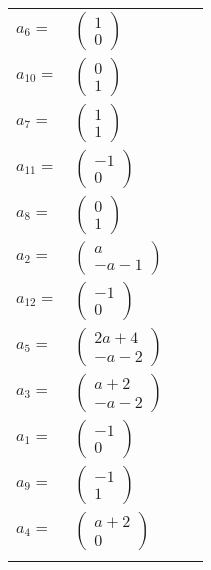 \documentclass[1p]{elsarticle_modified}
\theoremstyle{definition}
\begin{document}
\begin{tabular}{m{7pt} m{180pt} m{7pt} m{180pt} }
\flushright $a_{6}=$&$\begin{pmatrix}1\\0\end{pmatrix}$ \\
\flushright $a_{10}=$&$\begin{pmatrix}0\\1\end{pmatrix}$ \\
\flushright $a_{7}=$&$\begin{pmatrix}1\\1\end{pmatrix}$ \\
\flushright $a_{11}=$&$\begin{pmatrix}-1\\0\end{pmatrix}$ \\
\flushright $a_{8}=$&$\begin{pmatrix}0\\1\end{pmatrix}$ \\
\flushright $a_{2}=$&$\begin{pmatrix}a\\- a-1\end{pmatrix}$ \\
\flushright $a_{12}=$&$\begin{pmatrix}-1\\0\end{pmatrix}$ \\
\flushright $a_{5}=$&$\begin{pmatrix}2 a+4\\- a-2\end{pmatrix}$ \\
\flushright $a_{3}=$&$\begin{pmatrix}a+2\\- a-2\end{pmatrix}$ \\
\flushright $a_{1}=$&$\begin{pmatrix}-1\\0\end{pmatrix}$ \\
\flushright $a_{9}=$&$\begin{pmatrix}-1\\1\end{pmatrix}$ \\
\flushright $a_{4}=$&$\begin{pmatrix}a+2\\0\end{pmatrix}$\\&\end{tabular}
\end{document}
